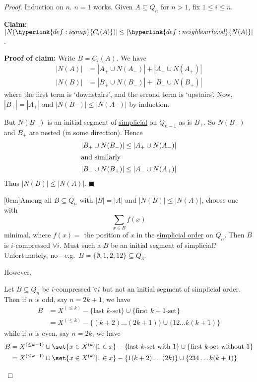 \documentclass{article}
\let\subset\subseteq
\begin{document}
\begin{proof}
  Induction on $n$. $n=1$ works.
  Given $A \subset Q_n$ for $n > 1$, fix $1 \leq i \leq n$.

  \textbf{Claim:} $|N(\hyperlink{def:icomp}{C_i(A)})| \leq |\hyperlink{def:neighbourhood}{N(A)}|$.

  \textbf{Proof of claim:} Write $B = C_i(A)$.
  We have
  \begin{align*}
    |N(A)| &= |A_+ \cup N(A_-)| + |A_- \cup N(A_+)| \\
    |N(B)| &= |B_+ \cup N(B_-)| + |B_- \cup N(B_+)|
  \end{align*}
  where the first term is `downstairs', and the second term is `upstairs'.
  Now, $|B_+| = |A_+|$ and $|N(B_-)| \leq |N(A_-)|$ by induction.

  But $N(B_-)$ is an initial segment of \hyperlink{def:simplicial}{simplicial} on $Q_{n-1}$ as is $B_+$.
  So $N(B_-)$ and $B_+$ are nested (in some direction).
  Hence
  \begin{align*}
    |B_+ \cup N(B_-)| &\leq |A_+ \cup N(A_-)| \\
    \shortintertext{and similarly}
    |B_- \cup N(B_+)| &\leq |A_- \cup N(A_+)|
  \end{align*}
  Thus $|N(B)| \leq |N(A)|$. $\blacksquare$

  [0cm]Among all $B \subset Q_n$ with $|B| = |A|$ and $|N(B)| \leq |N(A)|$, choose one with
  \begin{equation*}
    \sum_{x \in B} f(x)
  \end{equation*}
  minimal, where $f(x)=$ the position of $x$ in the \hyperlink{def:simplicial}{simplicial order} on $Q_n$.
  Then $B$ is $i$-compressed $\forall i$.
  Must such a $B$ be an initial segment of simplicial?
  Unfortunately, no - e.g.\ $B = \{\emptyset,1,2,12\} \subset Q_3$.

  However,
  \begin{nlemma}\label{lem:2.2}
    Let $B \subset Q_n$ be $i$-compressed $\forall i$ but not an initial segment of simplicial order.
    Then if $n$ is odd, say $n = 2k+1$, we have
    \begin{align*}
      B &= X^{(\leq k)} - \{\text{last $k$-set}\} \cup {\{\text{first $k+1$-set}\}}\\ %
        &= X^{(\leq k)} - \{(k+2) \dotsc (2k+1)\} \cup \{12\dotsc k(k+1)\}
    \end{align*}
    while if $n$ is even, say $n = 2k$, we have
    \begin{align*}
      B &= X^{(\leq k-1)} \cup \set{x \in X^{(k)} | 1 \in x} - \{\text{last $k$-set with 1}\} \cup \{\text{first $k$-set without $1$}\}\\ %
        &= X^{(\leq k-1)} \cup \set{x \in X^{(k)} | 1 \in x} - \{1(k+2)\dotsc(2k)\} \cup \{234\dotsc k(k+1)\}
    \end{align*}
  \end{nlemma}


\end{proof}
\end{document}
